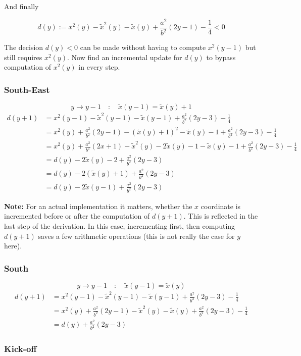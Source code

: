 \documentclass[12pt]{scrartcl}
\def\txy{\widetilde{x}(y)}
\def\txym{\widetilde{x}(y-1)}
\def\xys{x^2(y)}
\def\xyms{x^2(y-1)}
\def\txys{\widetilde{x}^2(y)}
\def\txyms{\widetilde{x}^2(y-1)}
\def\fab{\frac{a^2}{b^2}}
\def\dy{d(y)}
\def\dym{d(y+1)}
\def\fof{\frac{1}{4}}
\begin{document}
And finally

\begin{equation} 
\dy := \xys - \txys - \txy + \fab(2y-1) - \fof < 0
\label{eq:dy}
\end{equation}

The decision $ \dy < 0 $ can be made without having to compute $\xyms$ 
but still requires $\xys$. Now find an incremental update for $\dy$ to 
bypass computation of $\xys$ in every step.

\subsubsection*{South-East}

$$ y \rightarrow y-1 \quad:\quad \txym = \txy+1 $$
\begin{align}
\dym &= \xyms - \txyms - \txym + \fab(2y-3) - \fof \nonumber \\
     &= \xys + \fab(2y-1) - (\txy+1)^2 - \txy - 1 + \fab(2y-3) - \fof \nonumber \\
     &= \xys + \fab(2x+1) - \txys - 2\txy - 1 - \txy - 1 + \fab(2y-3) - \fof \nonumber \\
     &= \dy - 2\txy - 2 + \fab(2y-3) \nonumber \\
     &= \dy - 2(\txy + 1) + \fab(2y-3) \nonumber \\
     &= \dy - 2\txym + \fab(2y-3)
\label{eq:dyse}
\end{align}

\textbf{Note:} For an actual implementation it matters, whether the $x$
coordinate is incremented before or after the computation of $\dym$.
This is reflected in the last step of the derivation. In this case, 
incrementing first, then computing $\dym$ saves a few arithmetic 
operations (this is not really the case for $y$ here).

\subsubsection*{South}

$$ y \rightarrow y-1 \quad:\quad \txym = \txy $$
\begin{align}
\dym &= \xyms - \txyms - \txym + \fab(2y-3) - \fof \nonumber \\
     &= \xys + \fab(2y-1) - \txys - \txy + \fab(2y-3) - \fof \nonumber \\
     &= \dy + \fab(2y-3)
\label{eq:dys}
\end{align}

\subsubsection*{Kick-off}
\end{document}
